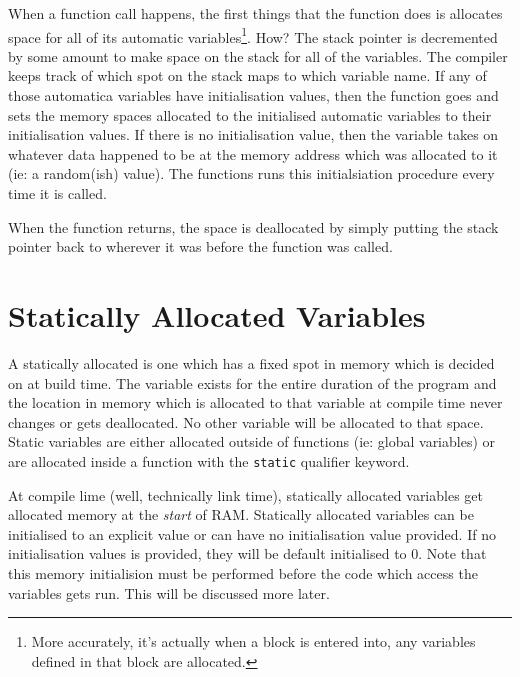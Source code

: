 When a function call happens, the first things that the function does is allocates space for all of its automatic variables\footnote{More accurately, it's actually when a block is entered into, any variables defined in that block are allocated.}. How? The stack pointer is decremented by some amount to make space on the stack for all of the variables. The compiler keeps track of which spot on the stack maps to which variable name. If any of those automatica variables have initialisation values, then the function goes and sets the memory spaces allocated to the initialised automatic variables to their initialisation values. If there is no initialisation value, then the variable takes on whatever data happened to be at the memory address which was allocated to it (ie: a random(ish) value). The functions runs this initialsiation procedure every time it is called. 

When the function returns, the space is deallocated by simply putting the stack pointer back to wherever it was before the function was called. 

\section{Statically Allocated Variables}
A statically allocated is one which has a fixed spot in memory which is decided on at build time. The variable exists for the entire duration of the program and the location in memory which is allocated to that variable at compile time never changes or gets deallocated. No other variable will be allocated to that space.
Static variables are either allocated outside of functions (ie: global variables) or are allocated inside a function with the \texttt{static} qualifier keyword. 

At compile lime (well, technically link time), statically allocated variables get allocated memory at the \emph{start} of RAM. Statically allocated variables can be initialised to an explicit value or can have no initialisation value provided. If no initialisation values is provided, they will be default initialised to 0. Note that this memory initialision must be performed before the code which access the variables gets run. This will be discussed more later.

